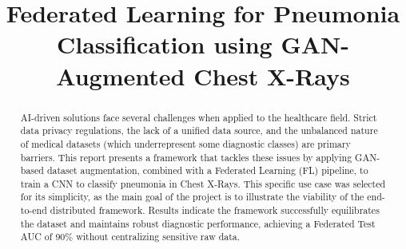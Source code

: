 \documentclass[conference]{IEEEtran}
\title{Federated Learning for Pneumonia Classification using GAN-Augmented Chest X-Rays}
\author{
  \IEEEauthorblockN{Pau Camós}
  \IEEEauthorblockA{\textit{Universitat Politècnica de Catalunya
  (UPC)}}
  \and
  \IEEEauthorblockN{Daniel Alamillo}
  \IEEEauthorblockA{\textit{Universitat Politècnica de Catalunya
  (UPC)}}
}
\begin{document}
\usetikzlibrary{positioning, fit, calc, arrows.meta, backgrounds}

\maketitle

\begin{abstract}
  AI-driven solutions face several challenges when applied to the
  healthcare field. Strict data privacy regulations, the lack of
  a unified data source, and the unbalanced nature of medical
  datasets (which underrepresent some diagnostic classes) are primary
  barriers. This report presents a framework that tackles these issues
  by applying GAN-based dataset augmentation, combined with a Federated
  Learning (FL) pipeline, to train a CNN to classify pneumonia in
  Chest X-Rays. This specific use case was selected for its simplicity,
  as the main goal of the project is to illustrate the viability of the
  end-to-end distributed framework. Results indicate the framework
  successfully equilibrates the dataset and maintains robust diagnostic
  performance, achieving a Federated Test AUC of 90\% without
  centralizing sensitive raw data.
\end{abstract}








\end{document}
